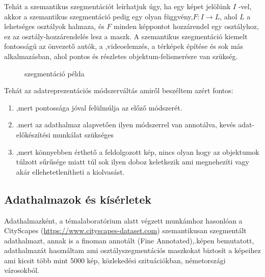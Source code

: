 \documentclass[12pt,oneside,a4paper]{article}
\theoremstyle{remark}
\begin{document}
Tehát a szemantikus szegmentációt leírhatjuk úgy, ha egy képet jelölünk \(I\) -vel, akkor a szemantikus
szegmentáció pedig egy olyan függvény,\(F: I \rightarrow L\), ahol \(L\) a lehetséges osztályok halmaza, és \(F\) minden
képpontot hozzárendel egy osztályhoz, ez az osztály-hozzárendelés lesz a maszk.
A szemantikus szegmentáció kiemelt fontosságú az önvezető autók, a
,videoelemzés, a térképek építése és sok más
alkalmazásban, ahol pontos és részletes objektum-felismerésre van szükség.
\begin{figure}[ht]
    \centering
    \caption{szegmentáció példa}
\end{figure}
Tehát az adatreprezentációs módszerváltás amiről beszéltem azért fontos:
\begin{enumerate}
    \item ,mert pontossága jóval felülmúlja az előző módszerét.
    \item .mert az adathalmaz alapvetően ilyen módszerrel van annotálva, kevés adat-előkészítési munkálat  szükséges
    \item ,mert könnyebben érthető a feldolgozott kép, nincs olyan hogy az objektumok túlzott sűrűsége miatt túl sok ilyen doboz keletkezik ami megnehezíti vagy akár ellehetetlenítheti a kiolvasást.
\end{enumerate}


\subsection{Adathalmazok és kísérletek}\label{subsec:adathalmazok-es-kiserletek}
    Adathalmazként, a témalaboratórium alatt végzett munkámhoz hasonlóan a CityScapes
    (\url{https://www.cityscapes-dataset.com}) szemantikusan szegmentált adathalmazt, annak is a finoman annotált
    (Fine Annotated),\label{kephivatkozas}.képen bemutatott,
    adathalmazát használtam ami osztályszegmentációs maszkokat biztosít a képeihez ami kicsit több mint 5000 kép, közlekedési szituációkban,
    németországi városokból.
\end{document}
